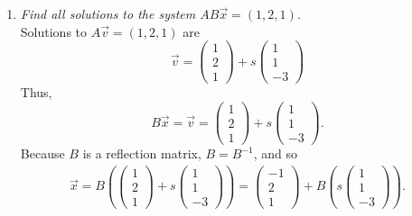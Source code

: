 \documentclass[12pt]{article}
\begin{document}
\begin{enumerate}[label=(\alph*)]
	\item \textit{Find all solutions to the system $AB\vec{x} = (1, 2, 1)$.}
	\\[\baselineskip]
	Solutions to $A\vec{v} = (1, 2, 1)$ are
	\begin{equation*}
		\vec{v} =
		\begin{pmatrix} 1 \\ 2 \\ 1 \end{pmatrix}
		+ s \begin{pmatrix} 1 \\ 1 \\ -3 \end{pmatrix}
	\end{equation*}
	Thus,
	\begin{equation*}
		B\vec{x} = \vec{v} =
		\begin{pmatrix} 1 \\ 2 \\ 1 \end{pmatrix}
		+ s \begin{pmatrix} 1 \\ 1 \\ -3 \end{pmatrix}
		.
	\end{equation*}
	Because $B$ is a reflection matrix, $B = B^{-1}$, and so
	\begin{align*}
		\vec{x} = B(
		\begin{pmatrix} 1 \\ 2 \\ 1 \end{pmatrix}
		+ s \begin{pmatrix} 1 \\ 1 \\ -3 \end{pmatrix}
		)
		=
		\boxed{
			\begin{pmatrix} -1 \\ 2 \\ 1 \end{pmatrix}
			+ B (s \begin{pmatrix} 1 \\ 1 \\ -3 \end{pmatrix})
		}
		.
	\end{align*}
\end{enumerate}
\end{document}
